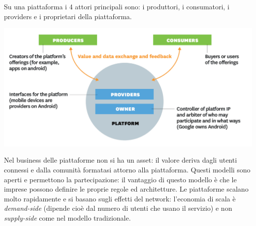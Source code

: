 \documentclass[a4page, 11pt]{article}
\begin{document}
Su una piattaforma i 4 attori principali sono: i produttori, i consumatori, i providers e i proprietari della piattaforma.
\begin{center}
	\includegraphics[scale=0.4]{image4.png}
\end{center}

Nel business delle piattaforme non si ha un asset: il valore deriva dagli utenti connessi e dalla comunità formatasi attorno alla piattaforma.
Questi modelli sono aperti e permettono la partecipazione: il vantaggio di questo modello è che le imprese possono definire le proprie regole ed architetture.
Le piattaforme scalano molto rapidamente e si basano sugli effetti del network: l'economia di scala è \textit{demand-side} (dipende cioè dal numero di utenti che usano il servizio) e non \textit{supply-side} come nel modello tradizionale.
\end{document}

